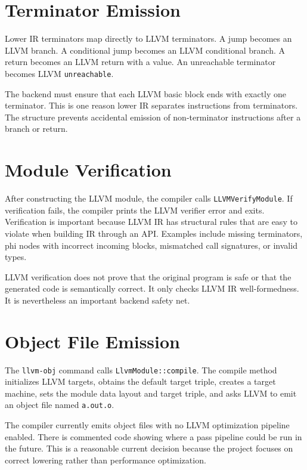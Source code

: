 \section{Terminator Emission}

Lower IR terminators map directly to LLVM terminators. A jump becomes an LLVM
branch. A conditional jump becomes an LLVM conditional branch. A return becomes
an LLVM return with a value. An unreachable terminator becomes LLVM
\texttt{unreachable}.

The backend must ensure that each LLVM basic block ends with exactly one
terminator. This is one reason lower IR separates instructions from terminators.
The structure prevents accidental emission of non-terminator instructions after
a branch or return.

\section{Module Verification}

After constructing the LLVM module, the compiler calls \texttt{LLVMVerifyModule}.
If verification fails, the compiler prints the LLVM verifier error and exits.
Verification is important because LLVM IR has structural rules that are easy to
violate when building IR through an API. Examples include missing terminators,
phi nodes with incorrect incoming blocks, mismatched call signatures, or invalid
types.

LLVM verification does not prove that the original \epl{} program is safe or
that the generated code is semantically correct. It only checks LLVM IR
well-formedness. It is nevertheless an important backend safety net.

\section{Object File Emission}

The \texttt{llvm-obj} command calls \texttt{LlvmModule::compile}. The compile
method initializes LLVM targets, obtains the default target triple, creates a
target machine, sets the module data layout and target triple, and asks LLVM to
emit an object file named \texttt{a.out.o}.

The compiler currently emits object files with no LLVM optimization pipeline
enabled. There is commented code showing where a pass pipeline could be run in
the future. This is a reasonable current decision because the project focuses on
correct lowering rather than performance optimization.

